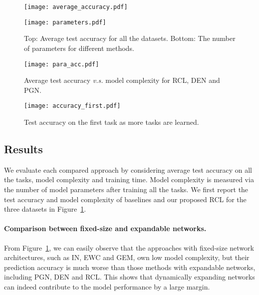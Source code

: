 \documentclass{article}
\begin{document}
\begin{figure}[htbp]
  \centering
    \begin{minipage}[b]{0.85\textwidth}
      \texttt{[image: average\_accuracy.pdf]}
    \end{minipage}
      \begin{minipage}[b]{0.85\textwidth}
    \texttt{[image: parameters.pdf]}
  \end{minipage}
  \caption{Top: Average test accuracy for all the datasets. Bottom: The number of parameters  for different methods. } \label{experiments}
\end{figure}



\begin{figure}[htbp]
  \texttt{[image: para\_acc.pdf]}
  \vspace{-0.5cm}
  \caption{Average test accuracy \emph{v.s.} model complexity for RCL, DEN and PGN.}
  \label{fig:accvspara}
\end{figure}

\begin{figure}[htbp]
  \centering
      \texttt{[image: accuracy\_first.pdf]}
      \vspace{-0.5cm}
  \caption{Test accuracy on the first task as more tasks are learned.} \label{fig:forgetting}
\end{figure}





\subsection{Results}
We evaluate each compared approach by considering  average test accuracy on all the tasks, model complexity and training time. Model complexity is measured via the number of model parameters after training all the tasks. We first report the test accuracy and model complexity of baselines and our proposed RCL for the three datasets in Figure~\ref{experiments}.

\paragraph{Comparison between fixed-size and expandable networks.}
From Figure~\ref{experiments}, we can easily observe that the approaches with fixed-size network architectures, such as  IN, EWC and GEM, own low model complexity, but their prediction accuracy is much worse than those methods with expandable networks, including PGN, DEN and RCL. This shows that dynamically expanding networks can  indeed contribute to the model performance by a large margin.
\end{document}
